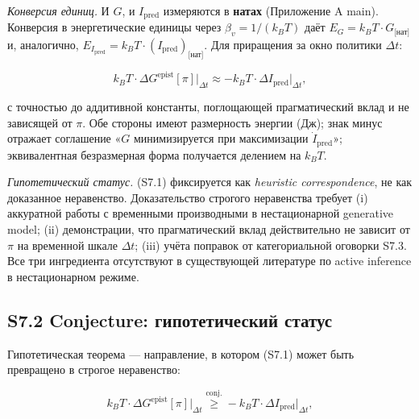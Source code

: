 \documentclass[pdflatex,sn-mathphys-ay]{sn-jnl}
\begin{document}
\emph{Конверсия единиц.} И \(G\), и \(I_{\text{pred}}\) измеряются в \textbf{натах} (Приложение A main). Конверсия в энергетические единицы через \(\beta_v = 1/(k_B T)\) даёт \(E_G = k_B T \cdot G_{\text{[нат]}}\) и, аналогично, \(E_{I_{\text{pred}}} = k_B T \cdot (I_{\text{pred}})_{\text{[нат]}}\). Для приращения за окно политики \(\Delta t\):



\begin{equation}k_B T \cdot \Delta G^{\text{epist}}[\pi]\bigr|_{\Delta t} \approx -k_B T \cdot \Delta I_{\text{pred}}\bigr|_{\Delta t}, \tag{S7.1}\end{equation}



с точностью до аддитивной константы, поглощающей прагматический вклад и не зависящей от \(\pi\). Обе стороны имеют размерность энергии (Дж); знак минус отражает соглашение «\(G\) минимизируется при максимизации \(\dot{I}_{\text{pred}}\)»; эквивалентная безразмерная форма получается делением на \(k_B T\).



\emph{Гипотетический статус.} (S7.1) фиксируется как \emph{heuristic correspondence}, не как доказанное неравенство. Доказательство строгого неравенства требует (i) аккуратной работы с временными производными в нестационарной generative model; (ii) демонстрации, что прагматический вклад действительно не зависит от \(\pi\) на временной шкале \(\Delta t\); (iii) учёта поправок от категориальной оговорки S7.3. Все три ингредиента отсутствуют в существующей литературе по active inference в нестационарном режиме.



\subsection*{S7.2 Conjecture: гипотетический статус}\label{s7.2-conjecture-ux433ux438ux43fux43eux442ux435ux442ux438ux447ux435ux441ux43aux438ux439-ux441ux442ux430ux442ux443ux441}



Гипотетическая теорема --- направление, в котором (S7.1) может быть превращено в строгое неравенство:



\begin{equation}k_B T \cdot \Delta G^{\text{epist}}[\pi]\bigr|_{\Delta t} \stackrel{\text{conj.}}{\ge} -k_B T \cdot \Delta I_{\text{pred}}\bigr|_{\Delta t}, \tag{S7.2}\end{equation}
\end{document}
